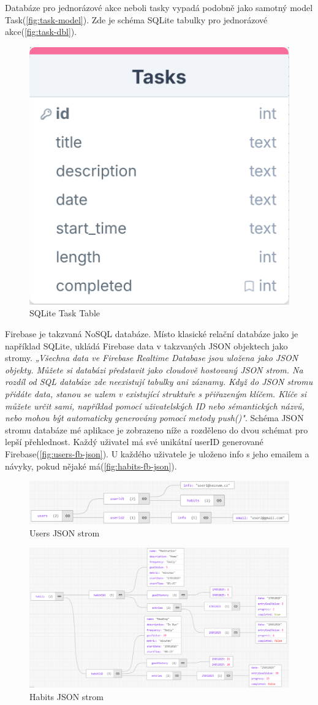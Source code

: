 Databáze pro jednorázové akce neboli tasky vypadá podobně jako samotný model Task(\autoref{fig:task-model}). Zde je schéma SQLite tabulky pro jednorázové akce(\autoref{fig:task-dbl}). 

\begin{figure}[H]
    \centering
    \includegraphics[width=0.5\linewidth]{images/task.png}
    \caption{SQLite Task Table}
    \label{fig:task-dbl}
\end{figure}

\newpage
\setcounter{enumiv}{4}
Firebase je takzvaná NoSQL databáze. Místo klasické relační databáze jako je například SQLite, ukládá Firebase data v takzvaných JSON objektech jako stromy. \textit{„Všechna data ve Firebase Realtime Database jsou uložena jako JSON objekty. Můžete si databázi představit jako cloudově hostovaný JSON strom. Na rozdíl od SQL databáze zde neexistují tabulky ani záznamy. Když do JSON stromu přidáte data, stanou se uzlem v existující struktuře s přiřazeným klíčem. Klíče si můžete určit sami, například pomocí uživatelských ID nebo sémantických názvů, nebo mohou být automaticky generovány pomocí metody push()"}\cite{firebase2025}. Schéma JSON stromu databáze mé aplikace je zobrazeno níže a rozděleno do dvou schémat pro lepší přehlednost. Každý uživatel má své unikátní userID generované Firebase(\autoref{fig:users-fb-json}). U každého uživatele je uloženo info s jeho emailem a návyky, pokud nějaké má(\autoref{fig:habits-fb-json}).

\begin{figure}[H]
    \centering
    \includegraphics[width=1\linewidth]{images/userschema.png}
    \caption{Users JSON strom}
    \label{fig:users-fb-json}
\end{figure}

\begin{figure}[H]
    \centering
    \includegraphics[width=1\linewidth]{images/habitschema.png}
    \caption{Habits JSON strom}
    \label{fig:habits-fb-json}
\end{figure}